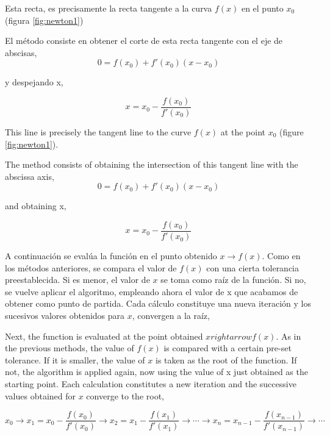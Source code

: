 \begin{paracol}{2}
Esta recta, es precisamente la recta tangente a la curva $f(x)$ en el punto $x_0$ (figura \ref{fig:newton1})

El método consiste en obtener el corte de esta recta tangente con el eje de abscisas,
\begin{equation*}
0= f(x_0)+f'(x_0)(x-x_0)
\end{equation*}

y despejando x,

\begin{equation*}
x=x_0-\frac{f(x_0)}{f'(x_0)}
\end{equation*}

\switchcolumn
This line is precisely the tangent line to the curve $f(x)$ at the point $x_0$ (figure \ref{fig:newton1}).

The method consists of obtaining the intersection of this tangent line with the abscissa axis,
\begin{equation*}
0= f(x_0)+f'(x_0)(x-x_0)
\end{equation*}

and obtaining x,

\begin{equation*}
x=x_0-\frac{f(x_0)}{f'(x_0)}
\end{equation*}

\switchcolumn
A continuación se evalúa la función en el punto obtenido $x\rightarrow f(x)$. Como en los métodos anteriores, se compara el valor de $f(x)$ con una cierta tolerancia preestablecida. Si es menor, el valor de $x$ se toma como raíz de la función. Si no, se vuelve aplicar el algoritmo, empleando ahora el valor de x que acabamos de obtener como punto de partida. Cada cálculo constituye una nueva iteración y los sucesivos valores obtenidos para $x$, convergen a la raíz,

\switchcolumn

Next, the function is evaluated at the point obtained $xrightarrow f(x)$. As in the previous methods, the value of $f(x)$ is compared with a certain pre-set tolerance. If it is smaller, the value of $x$ is taken as the root of the function. If not, the algorithm is applied again, now using the value of x just obtained as the starting point. Each calculation constitutes a new iteration and the successive values obtained for $x$ converge to the root,

\end{paracol}

\begin{equation*}
x_0\rightarrow x_1=x_0-\frac{f(x_0)}{f'(x_0)}\rightarrow x_2=x_1-\frac{f(x_1)}{f'(x_1)}\rightarrow  \cdots \rightarrow x_n=x_{n-1}-\frac{f(x_{n-1})}{f'(x_{n-1})}\rightarrow \cdots
\end{equation*}


